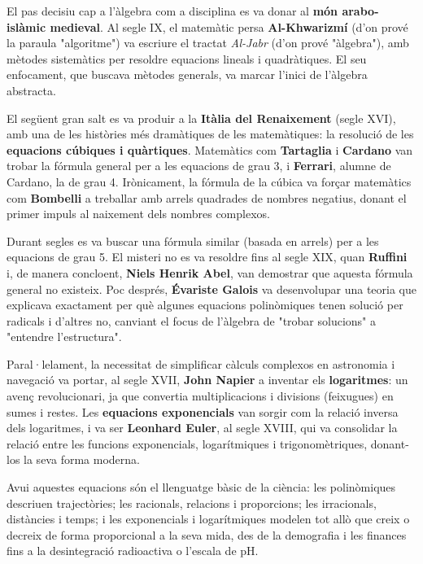 El pas decisiu cap a l'àlgebra com a disciplina es va donar al \textbf{món arabo-islàmic medieval}. Al segle IX, el matemàtic persa \textbf{Al-Khwarizmí} (d'on prové la paraula "algoritme") va escriure el tractat \emph{Al-Jabr} (d'on prové "àlgebra"), amb mètodes sistemàtics per resoldre equacions lineals i quadràtiques. El seu enfocament, que buscava mètodes generals, va marcar l'inici de l'àlgebra abstracta.

El següent gran salt es va produir a la \textbf{Itàlia del Renaixement} (segle XVI), amb una de les històries més dramàtiques de les matemàtiques: la resolució de les \textbf{equacions cúbiques i quàrtiques}. Matemàtics com \textbf{Tartaglia} i \textbf{Cardano} van trobar la fórmula general per a les equacions de grau 3, i \textbf{Ferrari}, alumne de Cardano, la de grau 4. Irònicament, la fórmula de la cúbica va forçar matemàtics com \textbf{Bombelli} a treballar amb arrels quadrades de nombres negatius, donant el primer impuls al naixement dels nombres complexos.

Durant segles es va buscar una fórmula similar (basada en arrels) per a les equacions de grau 5. El misteri no es va resoldre fins al segle XIX, quan \textbf{Ruffini} i, de manera concloent, \textbf{Niels Henrik Abel}, van demostrar que aquesta fórmula general no existeix. Poc després, \textbf{Évariste Galois} va desenvolupar una teoria que explicava exactament per què algunes equacions polinòmiques tenen solució per radicals i d'altres no, canviant el focus de l'àlgebra de "trobar solucions" a "entendre l'estructura".

Paral·lelament, la necessitat de simplificar càlculs complexos en astronomia i navegació va portar, al segle XVII, \textbf{John Napier} a inventar els \textbf{logaritmes}: un avenç revolucionari, ja que convertia multiplicacions i divisions (feixugues) en sumes i restes. Les \textbf{equacions exponencials} van sorgir com la relació inversa dels logaritmes, i va ser \textbf{Leonhard Euler}, al segle XVIII, qui va consolidar la relació entre les funcions exponencials, logarítmiques i trigonomètriques, donant-los la seva forma moderna.

Avui aquestes equacions són el llenguatge bàsic de la ciència: les polinòmiques descriuen trajectòries; les racionals, relacions i proporcions; les irracionals, distàncies i temps; i les exponencials i logarítmiques modelen tot allò que creix o decreix de forma proporcional a la seva mida, des de la demografia i les finances fins a la desintegració radioactiva o l'escala de pH.
